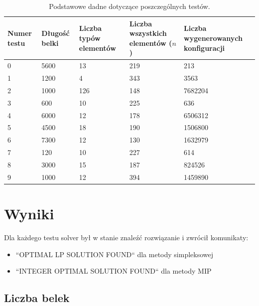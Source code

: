 \begin{table}[H] 
	\begin{center}
		\begin{tabular}{|p{3cm}|p{3cm}|p{3cm}|p{3cm}|p{3cm}| } \hline
			Numer testu & Długość belki & Liczba typów elementów & Liczba wszystkich elementów ($n$) & Liczba wygenerowanych konfiguracji\\ 
			\hline
			0 & 5600 & 13 & 219 & 213\\ 
			1 & 1200 & 4 & 343 & 3563\\ 
			2 & 1000 & 126 & 148 & 7682204\\ 
			3 & 600 & 10 & 225 & 636\\ 
			4 & 6000 & 12 & 178 & 6506312\\ 
			5 & 4500 & 18 & 190 & 1506800\\ 
			6 & 7300 & 12 & 130 & 1632979\\ 
			7 & 120 & 10 & 227 & 614\\ 
			8 & 3000 & 15 & 187 & 824526\\ 
			9 & 1000 & 12 & 394 & 1459890\\ 
			
			\hline
		\end{tabular}
		\caption{Podstawowe dadne dotyczące poszczególnych testów.}
	\end{center}
\end{table}


\section{Wyniki}

Dla każdego testu solver był w stanie znaleźć rozwiązanie i zwrócił komunikaty:
\begin{itemize}
	\item ``OPTIMAL LP SOLUTION FOUND`` dla metody simpleksowej
	\item ``INTEGER OPTIMAL SOLUTION FOUND`` dla metody MIP
\end{itemize}

\subsection{Liczba belek}


